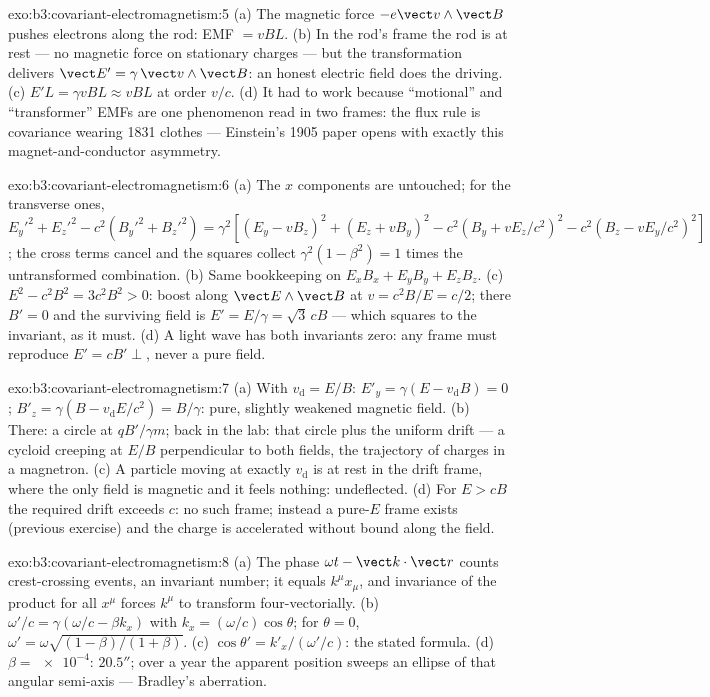 \begin{solution}{exo:b3:covariant-electromagnetism:5}
(a) The magnetic force $-e\vect v\wedge\vect B$ pushes electrons
along the rod: EMF $= vBL$. (b) In the rod's frame the rod is at
rest --- no magnetic force on stationary charges --- but the
transformation delivers $\vect E' = \gamma\,\vect v\wedge\vect B$:
an honest electric field does the driving. (c) $E'L = \gamma vBL
\approx vBL$ at order $v/c$. (d) It had to work because ``motional''
and ``transformer'' EMFs are one phenomenon read in two frames: the
flux rule is covariance wearing 1831 clothes --- Einstein's 1905
paper opens with exactly this magnet-and-conductor asymmetry.
\end{solution}

\begin{solution}{exo:b3:covariant-electromagnetism:6}
(a) The $x$ components are untouched; for the transverse ones,
$E_y'^2 + E_z'^2 - c^2(B_y'^2 + B_z'^2) = \gamma^2[(E_y - vB_z)^2 +
(E_z + vB_y)^2 - c^2(B_y + vE_z/c^2)^2 - c^2(B_z - vE_y/c^2)^2]$;
the cross terms cancel and the squares collect $\gamma^2(1 -
\beta^2) = 1$ times the untransformed combination. (b) Same
bookkeeping on $E_xB_x + E_yB_y + E_zB_z$. (c) $E^2 - c^2B^2 =
3c^2B^2 > 0$: boost along $\vect E\wedge\vect B$ at $v = c^2B/E =
c/2$; there $B' = 0$ and the surviving field is $E' = E/\gamma =
\sqrt3\,cB$ --- which squares to the invariant, as it must. (d) A light wave has both invariants
zero: any frame must reproduce $E' = cB' \perp$, never a pure field.
\end{solution}

\begin{solution}{exo:b3:covariant-electromagnetism:7}
(a) With $v_{\text{d}} = E/B$: $E'_y = \gamma(E - v_{\text{d}}B) =
0$; $B'_z = \gamma(B - v_{\text{d}}E/c^2) = B/\gamma$: pure, slightly
weakened magnetic field. (b) There: a circle at $qB'/\gamma m$; back
in the lab: that circle plus the uniform drift --- a cycloid creeping
at $E/B$ perpendicular to both fields, the trajectory of charges in
a magnetron. (c) A particle moving at exactly $v_{\text{d}}$ is at
rest in the drift frame, where the only field is magnetic and it
feels nothing: undeflected. (d) For $E > cB$ the required drift
exceeds $c$: no such frame; instead a pure-$E$ frame exists
(previous exercise) and the charge is accelerated without bound
along the field.
\end{solution}

\begin{solution}{exo:b3:covariant-electromagnetism:8}
(a) The phase $\omega t - \vect k\cdot\vect r$ counts crest-crossing
events, an invariant number; it equals $k^\mu x_\mu$, and
invariance of the product for all $x^\mu$ forces $k^\mu$ to
transform four-vectorially. (b) $\omega'/c = \gamma(\omega/c -
\beta k_x)$ with $k_x = (\omega/c)\cos\theta$; for $\theta = 0$,
$\omega' = \omega\sqrt{(1-\beta)/(1+\beta)}$. (c) $\cos\theta' =
k'_x/(\omega'/c)$: the stated formula. (d) $\beta = \num{e-4}$:
$20.5''$; over a year the apparent position sweeps an ellipse of that
angular semi-axis --- Bradley's aberration.
\end{solution}

